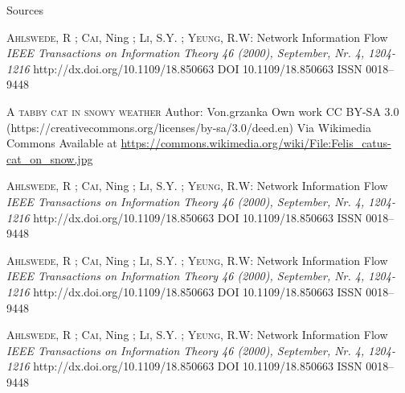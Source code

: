 \miniframesoff

\multipleslidetrue
\begin{frame}[allowframebreaks]{Sources}   

  \begin{thebibliography}{9}  

    \Fontvi

    \textsc{Ahlswede}, R ; \textsc{Cai}, Ning  ; \textsc{Li},
      S.Y. ; \textsc{Yeung},  R.W:
    \newblock Network Information Flow
    \emph{IEEE Transactions on Information Theory 46 (2000), September, Nr. 4, 1204-1216}
    \newblock http://dx.doi.org/10.1109/18.850663
    \newblock DOI 10.1109/18.850663
    \newblock ISSN 0018–9448

    \textsc{A tabby cat in snowy weather}
    \newblock Author: Von.grzanka
    \newblock Own work
    \newblock CC BY-SA 3.0 (https://creativecommons.org/licenses/by-sa/3.0/deed.en)
    \newblock Via Wikimedia Commons
    \newblock Available at \url{https://commons.wikimedia.org/wiki/File:Felis_catus-cat_on_snow.jpg}

    \textsc{Ahlswede}, R ; \textsc{Cai}, Ning  ; \textsc{Li},
      S.Y. ; \textsc{Yeung},  R.W:
    \newblock Network Information Flow
    \emph{IEEE Transactions on Information Theory 46 (2000), September, Nr. 4, 1204-1216}
    \newblock http://dx.doi.org/10.1109/18.850663
    \newblock DOI 10.1109/18.850663
    \newblock ISSN 0018–9448

    \textsc{Ahlswede}, R ; \textsc{Cai}, Ning  ; \textsc{Li},
      S.Y. ; \textsc{Yeung},  R.W:
    \newblock Network Information Flow
    \emph{IEEE Transactions on Information Theory 46 (2000), September, Nr. 4, 1204-1216}
    \newblock http://dx.doi.org/10.1109/18.850663
    \newblock DOI 10.1109/18.850663
    \newblock ISSN 0018–9448

    \textsc{Ahlswede}, R ; \textsc{Cai}, Ning  ; \textsc{Li},
      S.Y. ; \textsc{Yeung},  R.W:
    \newblock Network Information Flow
    \emph{IEEE Transactions on Information Theory 46 (2000), September, Nr. 4, 1204-1216}
    \newblock http://dx.doi.org/10.1109/18.850663
    \newblock DOI 10.1109/18.850663
    \newblock ISSN 0018–9448


\end{thebibliography}
\end{frame}
